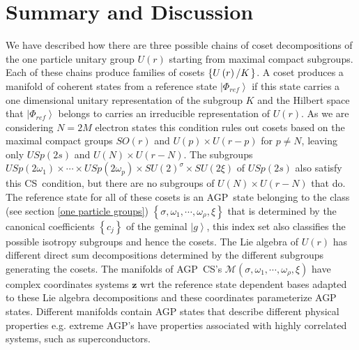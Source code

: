 \documentclass[aps,preprint]{revtex4}%
\begin{document}
\section{Summary and Discussion\label{discussion}}

We have described how there are three possible chains of coset decompositions
of the one particle unitary group $U\left(  r\right)  $ starting from maximal
compact subgroups. Each of these chains produce families of cosets $\left\{
U\left(  r\right)  \left/  K\right.  \right\}  $. A coset produces a manifold
of coherent states from a reference state $\left\vert \Phi_{ref}\right\rangle
$ if this state carries a one dimensional unitary representation of the
subgroup $K$ and the Hilbert space that $\left\vert \Phi_{ref}\right\rangle $
belongs to carries an irreducible representation of $U\left(  r\right)  .$ As
we are considering $N=2M$ electron states this condition rules out cosets
based on the maximal compact groups $SO(r)$ and $U\left(  p\right)  \times
U\left(  r-p\right)  $ for $p\neq N$, leaving only $USp\left(  2s\right)  $
and $U\left(  N\right)  \times U\left(  r-N\right)  $. The subgroups
$USp\left(  2\omega_{1}\right)  \times\cdots\times USp\left(  2\omega
_{p}\right)  \times SU\left(  2\right)  ^{\sigma}\times SU\left(  2\xi\right)
$ of $USp\left(  2s\right)  $ also satisfy this CS\ condition, but there are
no subgroups of $U\left(  N\right)  \times U\left(  r-N\right)  $ that do. The
reference state for all of these cosets is an AGP\ state belonging to the
class (see section \ref{one particle groups}) $\left\{  \sigma,\omega
_{1},\cdots,\omega_{\rho},\xi\right\}  $ that is determined by the canonical
coefficients $\left\{  c_{j}\right\}  $ of the geminal $\left\vert
g\right\rangle $, this index set also classifies the possible isotropy
subgroups and hence the cosets. The Lie algebra of $U\left(  r\right)  $ has
different direct sum decompositions determined by the different subgroups
generating the cosets. The manifolds of AGP\ CS's $\mathcal{M}\left(
\sigma,\omega_{1},\cdots,\omega_{\rho},\xi\right)  $ have complex coordinates
systems $\mathbf{z}$ wrt the reference state dependent bases adapted to these
Lie algebra decompositions and these coordinates parameterize AGP states.
Different manifolds contain AGP states that describe different physical
properties e.g. extreme AGP's have properties associated with highly
correlated systems, such as superconductors.
\end{document}
